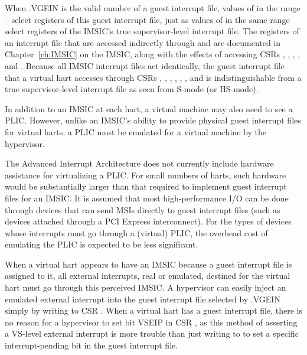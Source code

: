 When .VGEIN is the valid number of a guest interrupt
file, values of  in the range -- select
registers of this guest interrupt file, just as values of 
in the same range select registers of the IMSIC's true supervisor-level
interrupt file.
The registers of an interrupt file that are accessed indirectly through
 and  are documented in Chapter~\ref{ch:IMSIC}
on the IMSIC, along with the effects of accessing CSRs ,
, , , and .
Because all IMSIC interrupt files act identically, the guest interrupt
file that a virtual hart accesses through CSRs , ,
, , , ,
and  is indistinguishable from a true supervisor-level
interrupt file as seen from \mbox{S-mode} (or \mbox{HS-mode}).

In addition to an IMSIC at each hart, a virtual machine may also need
to see a PLIC.
However, unlike an IMSIC's ability to provide physical guest interrupt
files for virtual harts, a PLIC must be emulated for a virtual machine
by the hypervisor.

\begin{commentary}
The Advanced Interrupt Architecture does not currently include hardware
assistance for virtualizing a PLIC.
For small numbers of harts, such hardware would be substantially larger
than that required to implement guest interrupt files for an IMSIC.
It is assumed that most high-performance I/O can be done through
devices that can send MSIs directly to guest interrupt files (such as
devices attached through a PCI Express interconnect).
For the types of devices whose interrupts must go through a (virtual)
PLIC, the overhead cost of emulating the PLIC is expected to be less
significant.
\end{commentary}

When a virtual hart appears to have an IMSIC because a guest interrupt
file is assigned to it, all external interrupts, real or emulated,
destined for the virtual hart must go through this perceived IMSIC.
A hypervisor can easily inject an emulated external interrupt into the
guest interrupt file selected by .VGEIN simply by writing to
CSR .
When a virtual hart has a guest interrupt file, there is no reason
for a hypervisor to set bit VSEIP in CSR , as this method
of asserting a VS-level external interrupt is more trouble than just
writing to  to set a specific interrupt-pending bit in
the guest interrupt file.

